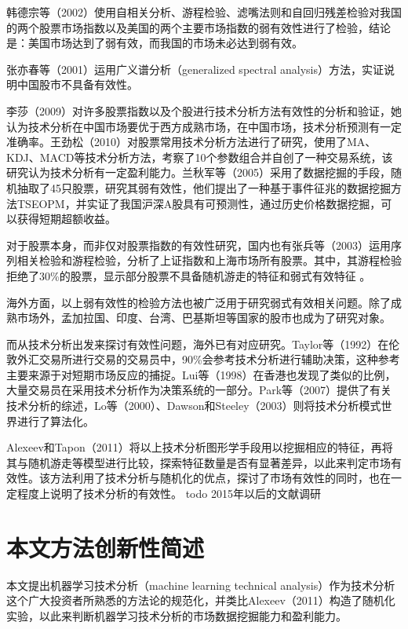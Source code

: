 \documentclass[twoside,longtitle]{LZUthesis}
\begin{document}
韩德宗等（2002）使用自相关分析、游程检验、滤嘴法则和自回归残差检验对我国的两个股票市场指数以及美国的两个主要市场指数的弱有效性进行了检验，结论是：美国市场达到了弱有效，而我国的市场未必达到弱有效\cite{韩德宗2002中美股票市场弱式有效性的比较研究}。

张亦春等（2001）运用广义谱分析（generalized spectral analysis）方法，实证说明中国股市不具备有效性\cite{张亦春2001中国股市弱式有效吗}。

李莎（2009）对许多股票指数以及个股进行技术分析方法有效性的分析和验证，她认为技术分析在中国市场要优于西方成熟市场，在中国市场，技术分析预测有一定准确率\cite{李莎2009股票市场中技术分析有效性的实证研究}。王劲松（2010）对股票常用技术分析方法进行了研究，使用了MA、KDJ、MACD等技术分析方法，考察了10个参数组合并自创了一种交易系统，该研究认为技术分析有一定盈利能力\cite{王劲松股市常用技术分析方法的有效性实证研究}。兰秋军等（2005）采用了数据挖掘的手段，随机抽取了45只股票，研究其弱有效性，他们提出了一种基于事件征兆的数据挖掘方法TSEOPM，并实证了我国沪深A股具有可预测性，通过历史价格数据挖掘，可以获得短期超额收益\cite{兰秋军2005中国股市弱有效吗}。

对于股票本身，而非仅对股票指数的有效性研究，国内也有张兵等（2003）运用序列相关检验和游程检验，分析了上证指数和上海市场所有股票。其中，其游程检验拒绝了30\%的股票，显示部分股票不具备随机游走的特征和弱式有效特征
\cite{张兵2003中国股票市场的渐进有效性研究}。

海外方面，以上弱有效性的检验方法也被广泛用于研究弱式有效相关问题。除了成熟市场外，孟加拉国、印度、台湾、巴基斯坦等国家的股市也成为了研究对象\cite{zsahmad2006testing}\cite{zsawad2009testing}\cite{zshaque2011testing}\cite{zsmobarek2000weak}。

而从技术分析出发来探讨有效性问题，海外已有对应研究。Taylor等（1992）在伦敦外汇交易所进行交易的交易员中，90\%会参考技术分析进行辅助决策，这种参考主要来源于对短期市场反应的捕捉。Lui等（1998）在香港也发现了类似的比例，大量交易员在采用技术分析作为决策系统的一部分。Park等（2007）提供了有关技术分析的综述，Lo等（2000）、Dawson和Steeley（2003）则将技术分析模式世界进行了算法化。

Alexeev和Tapon（2011）将以上技术分析图形学手段用以挖掘相应的特征，再将其与随机游走等模型进行比较，探索特征数量是否有显著差异，以此来判定市场有效性\cite{alexeev2011testing}。该方法利用了技术分析与随机化的优点，探讨了市场有效性的同时，也在一定程度上说明了技术分析的有效性。
todo 2015年以后的文献调研


\section{本文方法创新性简述}
本文提出机器学习技术分析（machine learning technical analysis）作为技术分析这个广大投资者所熟悉的方法论的规范化，并类比Alexeev（2011）构造了随机化实验，以此来判断机器学习技术分析的市场数据挖掘能力和盈利能力。
\end{document}
